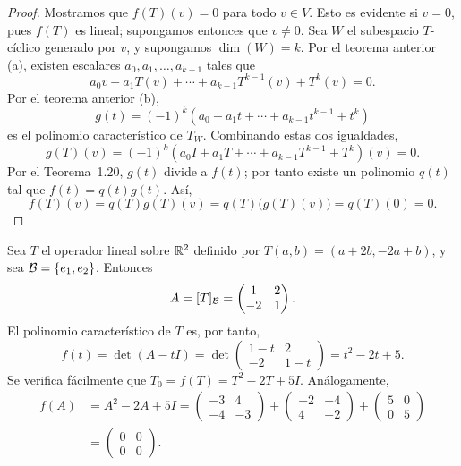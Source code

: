 \documentclass[12pt,a4paper]{book}
\begin{document}
    \begin{proof}
        Mostramos que $f(T)(v)=0$ para todo $v\in V$. Esto es evidente si $v=0$, pues $f(T)$ es lineal; supongamos entonces que $v\neq 0$. Sea $W$ el subespacio $T$-cíclico generado por $v$, y supongamos $\dim(W)=k$. Por el teorema anterior (a), existen escalares $a_0,a_1,\dots,a_{k-1}$ tales que
        \begin{equation*}
            a_0v+a_1T(v)+\cdots+a_{k-1}T^{k-1}(v)+T^k(v)=0.
        \end{equation*}
        Por el teorema anterior (b),
        \begin{equation*}
            g(t)=(-1)^k\left(a_0+a_1t+\cdots+a_{k-1}t^{k-1}+t^k\right)
        \end{equation*}
        es el polinomio característico de $T_W$. Combinando estas dos igualdades,
        \begin{equation*}
            g(T)(v)=(-1)^k\left(a_0I+a_1T+\cdots+a_{k-1}T^{k-1}+T^k\right)(v)=0.
        \end{equation*}
        Por el Teorema~1.20, $g(t)$ divide a $f(t)$; por tanto existe un polinomio $q(t)$ tal que $f(t)=q(t)g(t)$. Así,
        \begin{equation*}
            f(T)(v)=q(T)g(T)(v)=q(T)\big(g(T)(v)\big)=q(T)(0)=0.
        \end{equation*}
    \end{proof}

    \begin{ejemplo}
        Sea $T$ el operador lineal sobre $\mathbb{R}^2$ definido por $T(a,b)=(a+2b,-2a+b)$, y sea $\mathcal{B}=\{e_1,e_2\}$. Entonces
        \begin{equation*}
            A=[T]_{\mathcal{B}}=\begin{pmatrix}1&2\\-2&1\end{pmatrix}.
        \end{equation*}
        El polinomio característico de $T$ es, por tanto,
        \begin{equation*}
            f(t)=\det(A-tI)=\det\begin{pmatrix}1-t&2\\-2&1-t\end{pmatrix}=t^2-2t+5.
        \end{equation*}
        Se verifica fácilmente que $T_0=f(T)=T^2-2T+5I$. Análogamente,
        \begin{align*}
            f(A)&=A^2-2A+5I=\begin{pmatrix}-3&4\\-4&-3\end{pmatrix}+\begin{pmatrix}-2&-4\\4&-2\end{pmatrix}+\begin{pmatrix}5&0\\0&5\end{pmatrix}\\
            &=\begin{pmatrix}0&0\\0&0\end{pmatrix}.
        \end{align*}
    \end{ejemplo}
\end{document}
